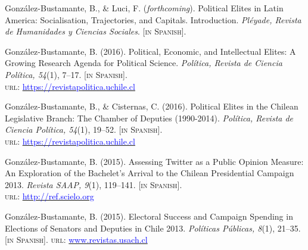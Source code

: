 
\begin{publications}

\begin{benumerate}{10}
\item{\small Gonz\'alez-Bustamante, B., \& Luci, F. ({\itshape forthcoming}). Political Elites in Latin America: Socialisation, Trajectories, and Capitals. Introduction. {\itshape Pléyade, Revista de Humanidades y Ciencias Sociales}. {\footnotesize \scshape [in Spanish]}.}\vspace{1mm}

\item{\small Gonz\'alez-Bustamante, B. (2016). Political, Economic, and Intellectual Elites: A Growing Research Agenda for Political Science. {\itshape Pol\'itica, Revista de Ciencia Pol\'itica, 54}(1), 7--17. {\footnotesize \scshape [in Spanish]}. \\ {\scshape url}: \href{https://revistapolitica.uchile.cl/index.php/RP/article/view/42690}{\textcolor{blue}{https://revistapolitica.uchile.cl}}}\vspace{1mm}

\item{\small Gonz\'alez-Bustamante, B., \& Cisternas, C. (2016). Political Elites in the Chilean Legislative Branch: The Chamber of Deputies (1990-2014). {\itshape Pol\'itica, Revista de Ciencia Pol\'itica, 54}(1), 19--52. {\footnotesize \scshape [in Spanish]}. \\ {\scshape url}: \href{https://revistapolitica.uchile.cl/index.php/RP/article/view/42691}{\textcolor{blue}{https://revistapolitica.uchile.cl}}}\vspace{1mm}

\item{\small Gonz\'alez-Bustamante, B. (2015). Assessing Twitter as a Public Opinion Measure: An Exploration of the Bachelet's Arrival to the Chilean Presidential Campaign 2013. {\itshape Revista SAAP, 9}(1), 119--141. {\footnotesize \scshape [in Spanish]}. \\ {\scshape url}: \href{http://ref.scielo.org/dwzhns}{\textcolor{blue}{http://ref.scielo.org}}} \vspace{1mm}

\item{\small Gonz\'alez-Bustamante, B. (2015). Electoral Success and Campaign Spending in Elections of Senators and Deputies in Chile 2013. {\itshape Pol\'iticas P\'ublicas, 8}(1), 21--35. {\footnotesize \scshape [in Spanish]}. {\scshape url}: \href{http://www.revistas.usach.cl/ojs/index.php/politicas/article/view/2182}{\textcolor{blue}{www.revistas.usach.cl}}} \vspace{1mm}


\end{benumerate}
\end{publications}
